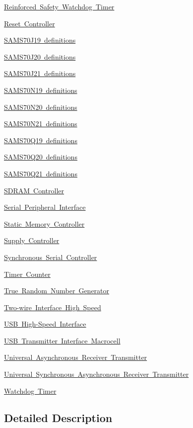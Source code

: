 \begin{DoxyCompactItemize}
\item 
\mbox{\hyperlink{group__SAMS70__RSWDT}{Reinforced Safety Watchdog Timer}}
\item 
\mbox{\hyperlink{group__SAMS70__RSTC}{Reset Controller}}
\item 
\mbox{\hyperlink{group__SAMS70J19__definitions}{S\+A\+M\+S70\+J19 definitions}}
\item 
\mbox{\hyperlink{group__SAMS70J20__definitions}{S\+A\+M\+S70\+J20 definitions}}
\item 
\mbox{\hyperlink{group__SAMS70J21__definitions}{S\+A\+M\+S70\+J21 definitions}}
\item 
\mbox{\hyperlink{group__SAMS70N19__definitions}{S\+A\+M\+S70\+N19 definitions}}
\item 
\mbox{\hyperlink{group__SAMS70N20__definitions}{S\+A\+M\+S70\+N20 definitions}}
\item 
\mbox{\hyperlink{group__SAMS70N21__definitions}{S\+A\+M\+S70\+N21 definitions}}
\item 
\mbox{\hyperlink{group__SAMS70Q19__definitions}{S\+A\+M\+S70\+Q19 definitions}}
\item 
\mbox{\hyperlink{group__SAMS70Q20__definitions}{S\+A\+M\+S70\+Q20 definitions}}
\item 
\mbox{\hyperlink{group__SAMS70Q21__definitions}{S\+A\+M\+S70\+Q21 definitions}}
\item 
\mbox{\hyperlink{group__SAMS70__SDRAMC}{S\+D\+R\+A\+M Controller}}
\item 
\mbox{\hyperlink{group__SAMS70__SPI}{Serial Peripheral Interface}}
\item 
\mbox{\hyperlink{group__SAMS70__SMC}{Static Memory Controller}}
\item 
\mbox{\hyperlink{group__SAMS70__SUPC}{Supply Controller}}
\item 
\mbox{\hyperlink{group__SAMS70__SSC}{Synchronous Serial Controller}}
\item 
\mbox{\hyperlink{group__SAMS70__TC}{Timer Counter}}
\item 
\mbox{\hyperlink{group__SAMS70__TRNG}{True Random Number Generator}}
\item 
\mbox{\hyperlink{group__SAMS70__TWIHS}{Two-\/wire Interface High Speed}}
\item 
\mbox{\hyperlink{group__SAMS70__USBHS}{U\+S\+B High-\/\+Speed Interface}}
\item 
\mbox{\hyperlink{group__SAMS70__UTMI}{U\+S\+B Transmitter Interface Macrocell}}
\item 
\mbox{\hyperlink{group__SAMS70__UART}{Universal Asynchronous Receiver Transmitter}}
\item 
\mbox{\hyperlink{group__SAMS70__USART}{Universal Synchronous Asynchronous Receiver Transmitter}}
\item 
\mbox{\hyperlink{group__SAMS70__WDT}{Watchdog Timer}}
\end{DoxyCompactItemize}


\subsection{Detailed Description}
